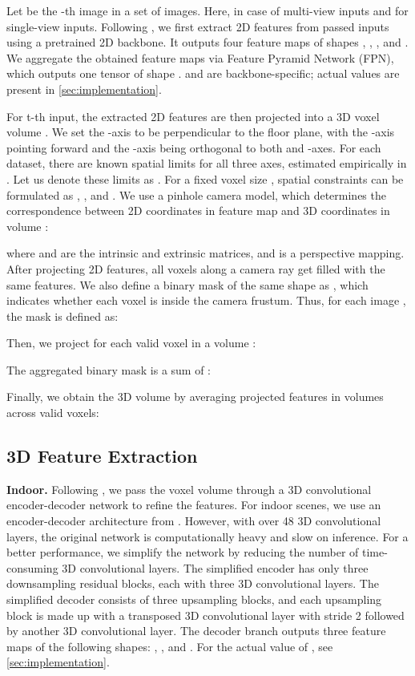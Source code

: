 \documentclass[10pt,twocolumn,letterpaper]{article}
\begin{document}
Let  be the -th image in a set of  images. Here,  in case of multi-view inputs and  for single-view inputs. Following \cite{murez2020atlas}, we first extract 2D features from passed inputs using a pretrained 2D backbone. It outputs four feature maps of shapes , , , and . We aggregate the obtained feature maps via Feature Pyramid Network (FPN), which outputs one tensor  of shape .  and  are backbone-specific; actual values are present in \ref{sec:implementation}.

For t-th input, the extracted 2D features  are then projected into a 3D voxel volume . We set the -axis to be perpendicular to the floor plane, with the -axis pointing forward and the -axis being orthogonal to both  and -axes. For each dataset, there are known spatial limits for all three axes, estimated empirically in \cite{zhang2020h3dnet, lang2019pointpillars, murez2020atlas}. Let us denote these limits as . For a fixed voxel size , spatial constraints can be formulated as , , and . We use a pinhole camera model, which determines the correspondence between 2D coordinates  in feature map  and 3D coordinates  in volume :

where  and  are the intrinsic and extrinsic matrices, and  is a perspective mapping. After projecting 2D features, all voxels along a camera ray get filled with the same features. We also define a binary mask  of the same shape as , which indicates whether each voxel is inside the camera frustum. Thus, for each image , the mask  is defined as:

Then, we project  for each valid voxel in a volume :

The aggregated binary mask  is a sum of :

Finally, we obtain the 3D volume  by averaging projected features in volumes  across valid voxels:


\subsection{3D Feature Extraction} \label{sec:features}

\textbf{Indoor.} Following \cite{murez2020atlas, hou20193dsis}, we pass the voxel volume  through a 3D convolutional encoder-decoder network to refine the features. For indoor scenes, we use an encoder-decoder architecture from \cite{murez2020atlas}. However, with over 48 3D convolutional layers, the original network is computationally heavy and slow on inference. For a better performance, we simplify the network by reducing the number of time-consuming 3D convolutional layers. The simplified encoder has only three downsampling residual blocks, each with three 3D convolutional layers. The simplified decoder consists of three upsampling blocks, and each upsampling block is made up with a transposed 3D convolutional layer with stride 2 followed by another 3D convolutional layer. The decoder branch outputs three feature maps of the following shapes: , , and . For the actual value of , see \ref{sec:implementation}.
\end{document}

